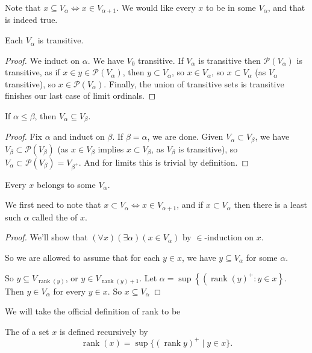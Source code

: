 \documentclass[a4paper, 10pt, twocolumn]{amsart}
\begin{document}
Note that $x \subseteq V_{\alpha} \Leftrightarrow x \in V_{\alpha+1}$. We would like every $x$ to be in some $V_\alpha$, and that is indeed true.

\begin{lemma}
  Each $V_\alpha$ is transitive. 
\end{lemma}
\begin{proof}
  We induct on $\alpha$. We have $V_0$ transitive. If $V_\alpha$ is transitive then $\mathcal{P}(V_\alpha)$ is transitive, as if $x \in y \in \mathcal{P}(V_\alpha)$, then $y \subset V_\alpha$, so $x \in V_\alpha$, so $x \subset V_\alpha$ (as $V_\alpha$ transitive), so $x \in \mathcal{P}(V_\alpha)$. Finally, the union of transitive sets is transitive finishes our last case of limit ordinals.
\end{proof}

\begin{lemma}
  If $\alpha \leq \beta$, then $V_\alpha \subseteq V_\beta$.
\end{lemma}
\begin{proof}
  Fix $\alpha$ and induct on $\beta$. If $\beta = \alpha$, we are done. Given $V_\alpha \subset V_\beta$, we have $V_\beta \subset \mathcal{P}(V_\beta)$ (as $x \in V_\beta$ implies $x \subset V_\beta$, as $V_\beta$ is transitive), so $V_\alpha \subset \mathcal{P}(V_\beta) = V_{\beta^+}$. And for limits this is trivial by definition.
\end{proof}

\begin{theorem}
  Every $x$ belongs to some $V_\alpha$.
\end{theorem}
We first need to note that $x \subset V_\alpha \Leftrightarrow x \in V_{\alpha+1}$, and if $x \subset V_{\alpha}$ then there is a least such $\alpha$ called the  of $x$.
\begin{proof}
  We'll show that $(\forall x)(\exists \alpha)\left(x \in V_\alpha\right)$ by $\in$-induction on $x$.

  So we are allowed to assume that for each $y \in x$, we have $y \subseteq V_\alpha$ for some $\alpha$.

  So $y \subseteq V_{\operatorname{rank}(y)}$, or $y \in V_{\operatorname{rank}(y)+1}$.
  Let $\alpha=\sup \left\{\left(\operatorname{rank}(y)^{+}: y \in x\right\}\right.$. Then $y \in V_\alpha$ for every $y \in x$. So $x \subseteq V_\alpha$   
\end{proof}

We will take the official definition of rank to be
\begin{definition}[Rank]
  The  of a set $x$ is defined recursively by
  $$
\operatorname{rank}(x) = \sup \{(\operatorname{rank} y)^+ \mid y \in x\}.
  $$
\end{definition}
\end{document}
